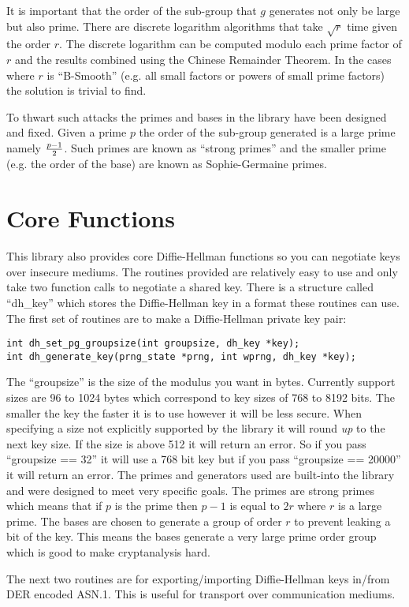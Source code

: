 \documentclass[synpaper]{book}
\newcommand{\mysection}[1]    %
	{                   %
	\section{#1}
   \markboth{\textsf{www.libtom.net}}{\thesection ~ {#1}}
	}
\begin{document}
It is important that the order of the sub-group that $g$ generates not only be large but also prime.  There are
discrete logarithm algorithms that take $\sqrt r$ time given the order $r$.  The discrete logarithm can be computed
modulo each prime factor of $r$ and the results combined using the Chinese Remainder Theorem.  In the cases where
$r$ is ``B-Smooth'' (e.g. all small factors or powers of small prime factors) the solution is trivial to find.

To thwart such attacks the primes and bases in the library have been designed and fixed.  Given a prime $p$ the order of
 the sub-group generated is a large prime namely ${p - 1} \over 2$.  Such primes are known as ``strong primes'' and the
smaller prime (e.g. the order of the base) are known as Sophie-Germaine primes.

\mysection{Core Functions}

This library also provides core Diffie-Hellman functions so you can negotiate keys over insecure mediums.  The routines
provided are relatively easy to use and only take two function calls to negotiate a shared key.  There is a structure
called ``dh\_key'' which stores the Diffie-Hellman key in a format these routines can use.  The first set of routines
are to make a Diffie-Hellman private key pair:
\begin{verbatim}
int dh_set_pg_groupsize(int groupsize, dh_key *key);
int dh_generate_key(prng_state *prng, int wprng, dh_key *key);
\end{verbatim}
The ``groupsize'' is the size of the modulus you want in bytes.  Currently support sizes are 96 to 1024 bytes which correspond
to key sizes of 768 to 8192 bits. The smaller the key the faster it is to use however it will be less secure.  When
specifying a size not explicitly supported by the library it will round {\em up} to the next key size.  If the size is
above 512 it will return an error.  So if you pass ``groupsize == 32'' it will use a 768 bit key but if you pass
``groupsize == 20000'' it will return an error.  The primes and generators used are built-into the library and were designed
to meet very specific goals.  The primes are strong primes which means that if $p$ is the prime then
$p-1$ is equal to $2r$ where $r$ is a large prime.  The bases are chosen to generate a group of order $r$ to prevent
leaking a bit of the key.  This means the bases generate a very large prime order group which is good to make cryptanalysis
hard.

The next two routines are for exporting/importing Diffie-Hellman keys in/from DER encoded ASN.1.  This is useful for transport
over communication mediums.
\end{document}
